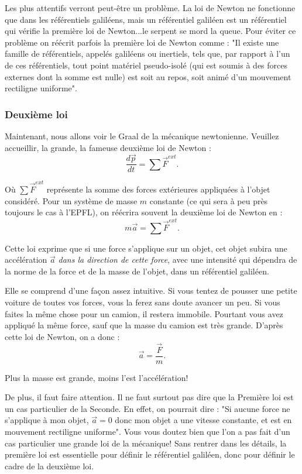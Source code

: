 \documentclass{article}
\begin{document}
    
Les plus attentifs verront peut-être un problème. La loi de Newton ne fonctionne que dans les référentiels galiléens, mais un référentiel galiléen est un référentiel qui vérifie la première loi de Newton...le serpent se mord la queue. Pour éviter ce problème on réécrit parfois la première loi de Newton comme : "Il existe une famille de référentiels, appelés galiléens ou inertiels, tels que, par rapport à l'un de ces référentiels, tout point matériel pseudo-isolé (qui est soumis à des forces externes dont la somme est nulle) est soit au repos, soit animé d'un mouvement rectiligne uniforme".
    
\subsubsection{Deuxième loi}

Maintenant, nous allons voir le Graal de la mécanique newtonienne. Veuillez accueillir, la grande, la fameuse deuxième loi de Newton :
\begin{equation*}
\boxed{    \dfrac{d\vec p}{dt}=\sum \vec {F}^{ext}.
}\end{equation*}

Où  $\sum \vec {F}^{ext}$ représente la somme des forces extérieures appliquées à l'objet considéré. Pour un système de masse $m$ constante (ce qui sera à peu près toujours le cas à l'EPFL), on réécrira souvent la deuxième loi de Newton en : \[m\vec{a}=\sum \vec {F}^{ext}.\]

Cette loi exprime que si une force s'applique sur un objet, cet objet subira une accélération $\vec a$ \textit{dans la direction de cette force}, avec une intensité qui dépendra de la norme de la force et de la masse de l'objet, dans un référentiel galiléen. 

Elle se comprend d'une façon assez intuitive. Si vous tentez de pousser une petite voiture de toutes vos forces, vous la ferez sans doute avancer un peu. Si vous faites la même chose pour un camion, il restera immobile. Pourtant vous avez appliqué la même force, sauf que la masse du camion est très grande. D'après cette loi de Newton, on a donc : \[\vec{a}=\dfrac{\vec{F}}{m}. \]

Plus la masse est grande, moins l'est l'accélération!

De plus, il faut faire attention. Il ne faut surtout pas dire que la Première loi est un cas particulier de la Seconde. En effet, on pourrait dire : "Si aucune force ne s'applique à mon objet, $\vec{a}=0$ donc mon objet a une vitesse constante, et est en mouvement rectiligne uniforme". Vous vous doutez bien que l'on a pas fait d'un cas particulier une grande loi de la mécanique! Sans rentrer dans les détails, la première loi est essentielle pour définir le référentiel galiléen, donc pour définir le cadre de la deuxième loi.\\
\end{document}
